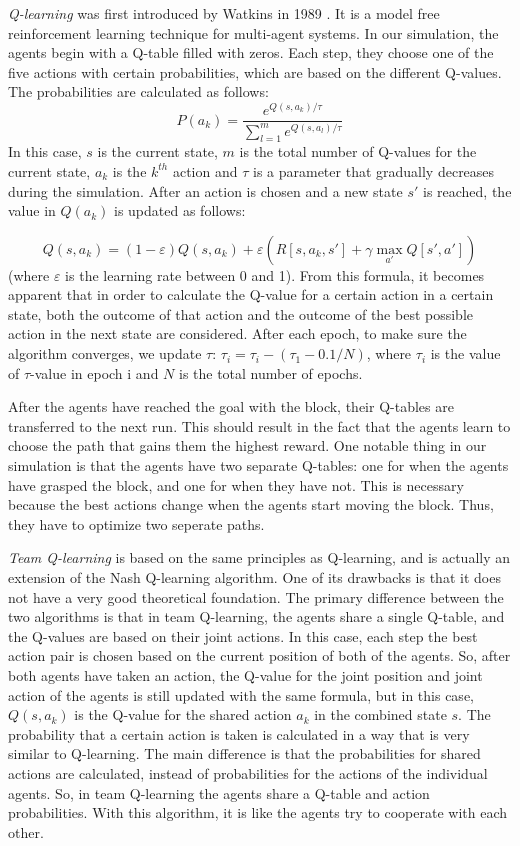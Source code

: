 \textit{Q-learning} was first introduced by Watkins in 1989 \cite{watkins1989}. It is a model free reinforcement learning technique for multi-agent systems. In our simulation, the agents begin with a Q-table filled with zeros. Each step, they choose one of the five actions with certain probabilities, which are based on the different Q-values. The probabilities are calculated as follows: 
\begin{equation}
	P(a_{k})=\frac{e^{Q(s,a_{k})/ \tau}}{\sum_{l=1}^{m}e^{Q(s,a_{l})/ \tau}}
\end{equation}
In this case, $s$ is the current state, $m$ is the total number of Q-values for the current state, $a_{k}$ is the $k^{th}$ action and $\tau$ is a parameter that gradually decreases during the simulation. After an action is chosen and a new state $s'$ is reached, the value in $Q(a_{k})$ is updated as follows: 

\begin{equation}
	Q(s,a_{k}) = (1- \varepsilon) Q(s,a_{k})+ \varepsilon (R [s, a_k, s'] + \gamma \max_{a'} Q[s', a'])
\end{equation}
(where $\varepsilon$ is the learning rate between 0 and 1). From this formula, it becomes apparent that in order to calculate the Q-value for a certain action in a certain state, both the outcome of that action and the outcome of the best possible action in the next state are considered. After each epoch, to make sure the algorithm converges, we update $\tau$: $\tau_{i} = \tau_{i}-(\tau_{1}-0.1/N)$, where $\tau_{i}$ is the value of $\tau$-value in epoch i and $N$ is the total number of epochs.

After the agents have reached the goal with the block, their Q-tables are transferred to the next run. This should result in the fact that the agents learn to choose the path that gains them the highest reward. One notable thing in our simulation is that the agents have two separate Q-tables: one for when the agents have grasped the block, and one for when they have not. This is necessary because the best actions change when the agents start moving the block. Thus, they have to optimize two seperate paths.

\textit{Team Q-learning} is based on the same principles as Q-learning, and is actually an extension of the Nash Q-learning algorithm. One of its drawbacks is that it does not have a very good theoretical foundation. The primary difference between the two algorithms is that in team Q-learning, the agents share a single Q-table, and the Q-values are based on their joint actions. In this case, each step the best action pair is chosen based on the current position of both of the agents. So, after both agents have taken an action, the Q-value for the joint position and joint action of the agents is still updated with the same formula, but in this case,  $Q(s,a_{k})$ is the Q-value for the shared action $a_{k}$ in the combined state $s$. The probability that a certain action is taken is calculated in a way that is very similar to Q-learning. The main difference is that the probabilities for shared actions are calculated, instead of probabilities for the actions of the individual agents. So, in team Q-learning the agents share a Q-table and action probabilities. With this algorithm, it is like the agents try to cooperate with each other.
